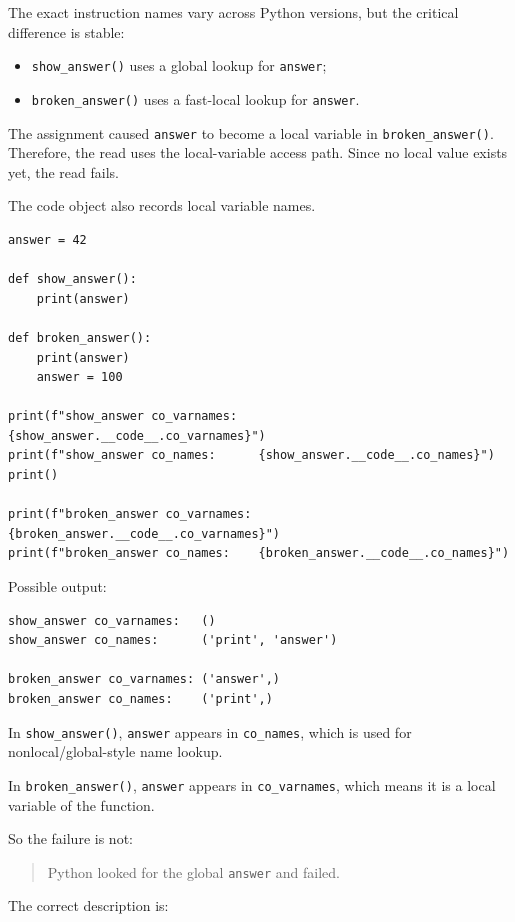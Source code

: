The exact instruction names vary across Python versions, but the critical difference is stable:

\begin{itemize}
    \item \texttt{show\_answer()} uses a global lookup for \texttt{answer};
    \item \texttt{broken\_answer()} uses a fast-local lookup for \texttt{answer}.
\end{itemize}

The assignment caused \texttt{answer} to become a local variable in \texttt{broken\_answer()}. Therefore, the read uses the local-variable access path. Since no local value exists yet, the read fails.

The code object also records local variable names.

\begin{verbatim}
answer = 42

def show_answer():
    print(answer)

def broken_answer():
    print(answer)
    answer = 100

print(f"show_answer co_varnames:   {show_answer.__code__.co_varnames}")
print(f"show_answer co_names:      {show_answer.__code__.co_names}")
print()

print(f"broken_answer co_varnames: {broken_answer.__code__.co_varnames}")
print(f"broken_answer co_names:    {broken_answer.__code__.co_names}")
\end{verbatim}

Possible output:

\begin{verbatim}
show_answer co_varnames:   ()
show_answer co_names:      ('print', 'answer')

broken_answer co_varnames: ('answer',)
broken_answer co_names:    ('print',)
\end{verbatim}

In \texttt{show\_answer()}, \texttt{answer} appears in \texttt{co\_names}, which is used for nonlocal/global-style name lookup.

In \texttt{broken\_answer()}, \texttt{answer} appears in \texttt{co\_varnames}, which means it is a local variable of the function.

So the failure is not:

\begin{quote}
Python looked for the global \texttt{answer} and failed.
\end{quote}

The correct description is:

